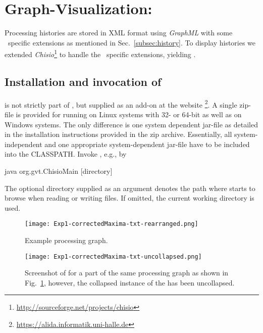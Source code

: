 \section{Graph-Visualization: \mtbc}
\label{app:chipory}

Processing histories are stored in XML format using {\em GraphML} with some
\alida\ specific extensions as mentioned in Sec.~\ref{subsec:history}.
To display histories we extended
{\em Chisio}\footnote{\href{http://sourceforge.net/projects/chisio}
{http://sourceforge.net/projects/chisio}} to handle the \alida\ specific
extensions, yielding \mtbc.

\subsection{Installation and invocation of \mtbc}

\mtbc is not strictly part of \alida, but supplied as an add-on
at the \alida website%
\footnote{\href{https://alida.informatik.uni-halle.de}{https://alida.informatik.uni-halle.de}}.
A single zip-file is provided for running \mtbc on Linux systems with 32- or
64-bit as well as on Windows systems. The only difference is one system
dependent jar-file as detailed in the installation instructions provided in the zip archive.
Essentially, all system-independent and one appropriate system-dependent
jar-file have to be included into the CLASSPATH.
Invoke \mtbc, e.g., by
\vspace*{0.5cm}
\begin{code}
  java org.gvt.ChisioMain [directory]
\end{code}

\vspace*{-0.25cm}
The optional directory supplied as an argument denotes the path where
\mtbc starts to browse when reading or writing files.
If omitted, the current working directory is used.

\begin{figure}[ht]
\centerline{{\texttt{[image: Exp1-correctedMaxima-txt-rearranged.png]}}}
\caption[Example of a processing graph.]{\label{fig:DAG-repeat}
Example processing graph.
}
\end{figure}

\begin{figure}
\begin{center}
{\texttt{[image: Exp1-correctedMaxima-txt-uncollapsed.png]}}
\caption{\label{fig:exa}Screenshot of \mtbc for a part of the same processing graph as shown in
Fig.~\ref{fig:DAG-repeat}, however, the collapsed instance of the
 has been uncollapsed.}
\end{center}
\end{figure}

